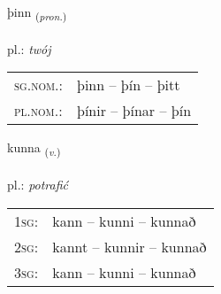 \documentclass[frontgrid, backgrid]{flacards}\usepackage[]{graphicx}\usepackage[]{xcolor}
\begin{document}
\renewcommand{\blhead}{\vskip5pt {\small\bfseries\footnotesize Fornafn | Pronoun }}
\renewcommand{\bcfoot}{\vskip5pt \hspace{2pt}{\small\bfseries\footnotesize 1K}}


{þinn \small{\textsubscript{(\textit{pron.})}} \\[1ex] %
\textphonetic{[θɪn]} \\
pl.: \emph{twój} \\  [2ex]
\renewcommand*{\arraystretch}{0.8}
\begin{tabular}{ll}
\textsc{sg.nom.}: & þinn  --  þín -- þitt \\ 
\textsc{pl.nom.}: & þínir -- þínar -- þín
\end{tabular}
}

\renewcommand{\flhead}{\vskip5pt \fboxsep=0pt {\small\bfseries\footnotesize Sagnorð | Verb}}
\renewcommand{\fcfoot}{\vskip5pt \fboxsep=0pt \hspace{2pt}{\small\bfseries\footnotesize 1K}}

\renewcommand{\blhead}{\vskip5pt {\small\bfseries\footnotesize Sagnorð | Verb }}
\renewcommand{\bcfoot}{\vskip5pt \hspace{2pt}{\small\bfseries\footnotesize 1K}}


{kunna \small{\textsubscript{(\textit{v.})}} \\[1ex] %
\textphonetic{[kʰʏna]} \\
pl.: \emph{potrafić} \\  [2ex]
\renewcommand*{\arraystretch}{0.8}
\begin{tabular}{p{1cm}l}
\textsc{1sg}: & kann -- kunni -- kunnað \\ 
\textsc{2sg}: & kannt -- kunnir -- kunnað \\ 
\textsc{3sg}: & kann -- kunni -- kunnað \\ 
\end{tabular}
}

\renewcommand{\flhead}{\vskip5pt \fboxsep=0pt {\small\bfseries\footnotesize Nafnorð | Noun}}
\renewcommand{\fcfoot}{\vskip5pt \fboxsep=0pt \hspace{2pt}{\small\bfseries\footnotesize 1K}}
\end{document}
